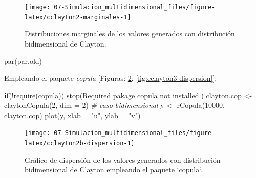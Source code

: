 \documentclass[
]{book}
\newenvironment{Shaded}{\begin{snugshade}}{\end{snugshade}}
\newcommand{\AttributeTok}[1]{\textcolor[rgb]{0.77,0.63,0.00}{#1}}
\newcommand{\CommentTok}[1]{\textcolor[rgb]{0.56,0.35,0.01}{\textit{#1}}}
\newcommand{\ControlFlowTok}[1]{\textcolor[rgb]{0.13,0.29,0.53}{\textbf{#1}}}
\newcommand{\DecValTok}[1]{\textcolor[rgb]{0.00,0.00,0.81}{#1}}
\newcommand{\FunctionTok}[1]{\textcolor[rgb]{0.00,0.00,0.00}{#1}}
\newcommand{\NormalTok}[1]{#1}
\newcommand{\OtherTok}[1]{\textcolor[rgb]{0.56,0.35,0.01}{#1}}
\newcommand{\SpecialCharTok}[1]{\textcolor[rgb]{0.00,0.00,0.00}{#1}}
\newcommand{\StringTok}[1]{\textcolor[rgb]{0.31,0.60,0.02}{#1}}
\theoremstyle{break}
\theoremstyle{definition}
\theoremstyle{definition}
\theoremstyle{definition}
\theoremstyle{definition}
\theoremstyle{remark}
\begin{document}
\begin{enumerate}
  \begin{figure}[!htb]

  {\centering \texttt{[image: 07-Simulacion\_multidimensional\_files/figure-latex/cclayton2-marginales-1]} 

  }

  \caption{Distribuciones marginales de los valores generados con distribución bidimensional de Clayton.}\label{fig:cclayton2-marginales}
  \end{figure}

\begin{Shaded}
\begin{Highlighting}[]
\FunctionTok{par}\NormalTok{(par.old)}
\end{Highlighting}
\end{Shaded}

  Empleando el paquete \emph{copula} {[}Figuras: \ref{fig:cclayton2b-dispersion}, \ref{fig:cclayton3-dispersion}{]}:

\begin{Shaded}
\begin{Highlighting}[]
\ControlFlowTok{if}\NormalTok{(}\SpecialCharTok{!}\FunctionTok{require}\NormalTok{(copula)) }\FunctionTok{stop}\NormalTok{(}\StringTok{\textquotesingle{}Required pakage \textasciigrave{}copula\textasciigrave{} not installed.\textquotesingle{}}\NormalTok{)}
\NormalTok{clayton.cop }\OtherTok{\textless{}{-}} \FunctionTok{claytonCopula}\NormalTok{(}\DecValTok{2}\NormalTok{, }\AttributeTok{dim =} \DecValTok{2}\NormalTok{) }\CommentTok{\# caso bidimensional}
\NormalTok{y }\OtherTok{\textless{}{-}} \FunctionTok{rCopula}\NormalTok{(}\DecValTok{10000}\NormalTok{, clayton.cop)}
\FunctionTok{plot}\NormalTok{(y, }\AttributeTok{xlab =} \StringTok{"u"}\NormalTok{, }\AttributeTok{ylab =} \StringTok{"v"}\NormalTok{)}
\end{Highlighting}
\end{Shaded}

  \begin{figure}[!htb]

  {\centering \texttt{[image: 07-Simulacion\_multidimensional\_files/figure-latex/cclayton2b-dispersion-1]} 

  }

  \caption{Gráfico de dispersión de los valores generados con distribución bidimensional de Clayton empleando el paquete `copula`.}\label{fig:cclayton2b-dispersion}
  \end{figure}


\end{enumerate}
\end{document}
